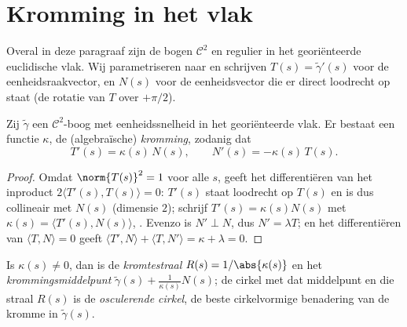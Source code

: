 \section{Kromming in het vlak}

Overal in deze paragraaf zijn de bogen $\mathcal{C}^2$ en regulier
in het georiënteerde euclidische vlak. Wij parametriseren naar
 en schrijven $T(s) = \tilde\gamma'(s)$ voor de
eenheidsraakvector, en $N(s)$ voor de eenheidsvector die er direct
loodrecht op staat (de rotatie van $T$ over $+\pi/2$).

\begin{theorem}\label{thm:b2:curves:frenet2d}
Zij $\tilde\gamma$ een $\mathcal{C}^2$-boog met eenheidssnelheid in
het georiënteerde vlak. Er bestaat een  functie $\kappa$,
de (algebraïsche) \emph{kromming}, zodanig dat
\[
T'(s) = \kappa(s)\, N(s),
\qquad
N'(s) = -\kappa(s)\, T(s).
\]
\end{theorem}

\begin{proof}
Omdat $\norm{T(s)}^2 = 1$ voor alle $s$, geeft het differentiëren
van het inproduct $2\langle T'(s), T(s)\rangle = 0$: $T'(s)$ staat
loodrecht op $T(s)$ en is dus collineair met $N(s)$ (dimensie $2$);
schrijf $T'(s) = \kappa(s) N(s)$ met $\kappa(s) = \langle T'(s),
N(s)\rangle$, . Evenzo is $N' \perp N$, dus $N' = \lambda
T$; en het differentiëren van $\langle T, N\rangle = 0$ geeft
$\langle T', N\rangle + \langle T, N'\rangle = \kappa + \lambda =
0$.
\end{proof}

\begin{definition}\label{def:b2:curves:curvature}
Is $\kappa(s) \neq 0$, dan is de
\emph{kromtestraal} $R(s) = 1/\abs{\kappa(s)}$
en het \emph{krommingsmiddelpunt}
$\tilde\gamma(s) + \frac{1}{\kappa(s)} N(s)$; de cirkel met dat
middelpunt en die straal $R(s)$ is de \emph{osculerende
cirkel}, de beste cirkelvormige
benadering van de kromme in $\tilde\gamma(s)$.
\end{definition}

